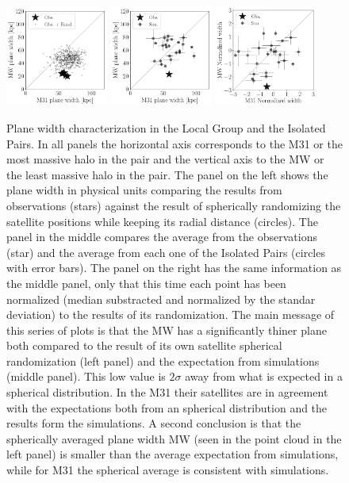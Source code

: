 \documentclass[a4paper,fleqn,usenatbib]{mnras}
\begin{document}

\begin{figure}
\centering
\includegraphics[width=0.30\textwidth]{scatter_random_ranked_width.pdf}
\includegraphics[width=0.30\textwidth]{scatter_ranked_illudm_width.pdf}
\includegraphics[width=0.30\textwidth]{scatter_norm_ranked_illudm_width.pdf}
\caption{Plane width characterization in the Local Group and the
  Isolated Pairs. In all panels the horizontal axis corresponds to the
  M31 or the most massive halo in the pair and the vertical axis to
  the MW or the least massive halo in the pair.
The panel on the left shows the plane width in physical units
comparing the results from observations
(stars) against the result of spherically randomizing the satellite
positions while keeping its radial distance (circles). 
The panel in the middle compares the average from the observations
(star) and the average from each one of the Isolated Pairs (circles
with error bars).
The panel on the right has the same information as the middle panel,
only that this time each point has been normalized (median substracted
and normalized by the standar deviation) to the results of its
randomization. 
The main message of this series of plots is that the MW has a
significantly thiner plane both compared to the result of its own
satellite spherical randomization (left panel) and the expectation from
simulations (middle panel). 
This low value is $2\sigma$ away from what is expected in a spherical
distribution. 
In the M31 their satellites are in agreement with the expectations
both from an spherical distribution and the results form the
simulations. 
A second conclusion is that the spherically averaged plane width
MW (seen in the point cloud in the left panel) is smaller than the
average expectation from simulations, while for M31 the spherical
average is consistent with simulations. 
\label{fig:scatter_width}}
\end{figure}
\end{document}
